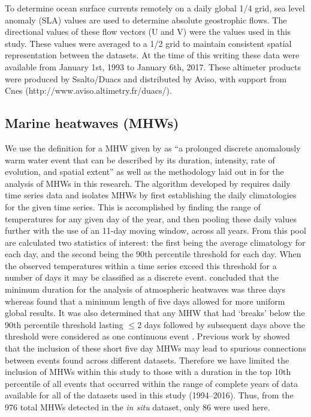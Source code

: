 \documentclass[utf8]{frontiersSCNS}
\begin{document}
To determine ocean surface currents remotely on a daily global 1/4\degree \: grid, sea level anomaly (SLA) values are used to determine absolute geostrophic flows. The directional values of these flow vectors (U and V) were the values used in this study. These values were averaged to a 1/2\degree \: grid to maintain consistent spatial representation between the datasets. At the time of this writing these data were available from January 1st, 1993 to January 6th, 2017. These altimeter products were produced by Ssalto/Duacs and distributed by Aviso, with support from Cnes (http://www.aviso.altimetry.fr/duacs/). 

\subsection{Marine heatwaves (MHWs)}
We use the definition for a MHW given by \citet{Hobday2016} as ``a prolonged discrete anomalously warm water event that can be described by its duration, intensity, rate of evolution, and spatial extent'' as well as the methodology laid out in \citet{Hobday2016} for the analysis of MHWs in this research. The algorithm developed by \citet{Hobday2016} requires daily time series data and isolates MHWs by first establishing the daily climatologies for the given time series. This is accomplished by finding the range of temperatures for any given day of the year, and then pooling these daily values further with the use of an 11-day moving window, across all years. From this pool are calculated two statistics of interest: the first being the average climatology for each day, and the second being the 90th percentile threshold for each day. When the observed temperatures within a time series exceed this threshold for a number of days it may be classified as a discrete event. \citet{Perkins2013} concluded that the minimum duration for the analysis of atmospheric heatwaves was three days whereas \citet{Hobday2016} found that a minimum length of five days allowed for more uniform global results. It was also determined that any MHW that had `breaks' below the 90th percentile threshold lasting $\leq$2 days followed by subsequent days above the threshold were considered as one continuous event \citep{Hobday2016}. Previous work by \citet{Schlegel2017} showed that the inclusion of these short five day MHWs may lead to spurious connections between events found across different datasets. Therefore we have limited the inclusion of MHWs within this study to those with a duration in the top 10th percentile of all events that occurred within the range of complete years of data available for all of the datasets used in this study (1994--2016). Thus, from the 976 total MHWs detected in the \emph{in situ} dataset, only 86 were used here.
\end{document}
